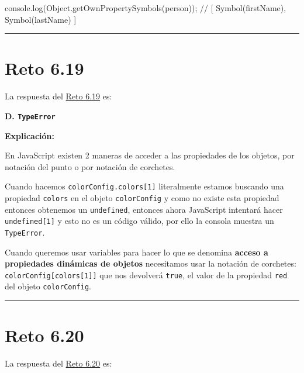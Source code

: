 \documentclass[
  letterpaper,
  DIV=11,
  numbers=noendperiod]{scrreprt}
\newenvironment{Shaded}{\begin{snugshade}}{\end{snugshade}}
\newcommand{\BuiltInTok}[1]{\textcolor[rgb]{0.00,0.23,0.31}{#1}}
\newcommand{\CommentTok}[1]{\textcolor[rgb]{0.37,0.37,0.37}{#1}}
\newcommand{\FunctionTok}[1]{\textcolor[rgb]{0.28,0.35,0.67}{#1}}
\newcommand{\NormalTok}[1]{\textcolor[rgb]{0.00,0.23,0.31}{#1}}
\newcommand{\OperatorTok}[1]{\textcolor[rgb]{0.37,0.37,0.37}{#1}}
\begin{document}
\begin{Shaded}
\begin{Highlighting}[]
\BuiltInTok{console}\OperatorTok{.}\FunctionTok{log}\NormalTok{(}\BuiltInTok{Object}\OperatorTok{.}\FunctionTok{getOwnPropertySymbols}\NormalTok{(person))}\OperatorTok{;} 
\CommentTok{// [ Symbol(firstName\textquotesingle{}), Symbol(lastName) ]}
\end{Highlighting}
\end{Shaded}

\begin{center}\rule{0.5\linewidth}{0.5pt}\end{center}

\section{Reto 6.19}\label{sec-sol-cap6-reto19}

La respuesta del \hyperref[sec-cap6-reto19]{Reto 6.19} es:

\textbf{D. \texttt{TypeError}}

\textbf{Explicación:}

En JavaScript existen 2 maneras de acceder a las propiedades de los
objetos, por notación del punto o por notación de corchetes.

Cuando hacemos \texttt{colorConfig.colors{[}1{]}} literalmente estamos
buscando una propiedad \texttt{colors} en el objeto \texttt{colorConfig}
y como no existe esta propiedad entonces obtenemos un
\texttt{undefined}, entonces ahora JavaScript intentará hacer
\texttt{undefined{[}1{]}} y esto no es un código válido, por ello la
consola muestra un \texttt{TypeError}.

Cuando queremos usar variables para hacer lo que se denomina
\textbf{acceso a propiedades dinámicas de objetos} necesitamos usar la
notación de corchetes: \texttt{colorConfig{[}colors{[}1{]}{]}} que nos
devolverá \texttt{true}, el valor de la propiedad \texttt{red} del
objeto \texttt{colorConfig}.

\begin{center}\rule{0.5\linewidth}{0.5pt}\end{center}

\section{Reto 6.20}\label{sec-sol-cap6-reto20}

La respuesta del \hyperref[sec-cap6-reto20]{Reto 6.20} es:
\end{document}
